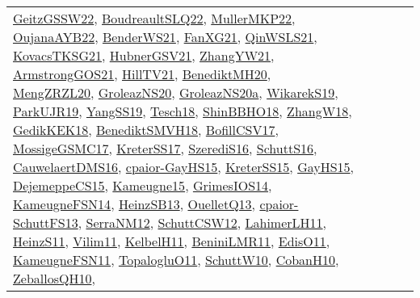 {\begin{longtable}{lp{3cm}>{\raggedright}p{6cm}>{\raggedright}p{6cm}p{8cm}}
\href{papers/GeitzGSSW22.pdf}{GeitzGSSW22}\cite{GeitzGSSW22}, \href{papers/BoudreaultSLQ22.pdf}{BoudreaultSLQ22}\cite{BoudreaultSLQ22}, \href{articles/MullerMKP22.pdf}{MullerMKP22}\cite{MullerMKP22}, \href{papers/OujanaAYB22.pdf}{OujanaAYB22}\cite{OujanaAYB22}, \href{papers/BenderWS21.pdf}{BenderWS21}\cite{BenderWS21}, \href{articles/FanXG21.pdf}{FanXG21}\cite{FanXG21}, \href{articles/QinWSLS21.pdf}{QinWSLS21}\cite{QinWSLS21}, \href{papers/KovacsTKSG21.pdf}{KovacsTKSG21}\cite{KovacsTKSG21}, \href{articles/HubnerGSV21.pdf}{HubnerGSV21}\cite{HubnerGSV21}, \href{articles/ZhangYW21.pdf}{ZhangYW21}\cite{ZhangYW21}, \href{papers/ArmstrongGOS21.pdf}{ArmstrongGOS21}\cite{ArmstrongGOS21}, \href{papers/HillTV21.pdf}{HillTV21}\cite{HillTV21}, \href{articles/BenediktMH20.pdf}{BenediktMH20}\cite{BenediktMH20}, \href{articles/MengZRZL20.pdf}{MengZRZL20}\cite{MengZRZL20}, \href{papers/GroleazNS20.pdf}{GroleazNS20}\cite{GroleazNS20}, \href{papers/GroleazNS20a.pdf}{GroleazNS20a}\cite{GroleazNS20a}, \href{articles/WikarekS19.pdf}{WikarekS19}\cite{WikarekS19}, \href{papers/ParkUJR19.pdf}{ParkUJR19}\cite{ParkUJR19}, \href{papers/YangSS19.pdf}{YangSS19}\cite{YangSS19}, \href{papers/Tesch18.pdf}{Tesch18}\cite{Tesch18}, \href{articles/ShinBBHO18.pdf}{ShinBBHO18}\cite{ShinBBHO18}, \href{articles/ZhangW18.pdf}{ZhangW18}\cite{ZhangW18}, \href{articles/GedikKEK18.pdf}{GedikKEK18}\cite{GedikKEK18}, \href{papers/BenediktSMVH18.pdf}{BenediktSMVH18}\cite{BenediktSMVH18}, \href{papers/BofillCSV17.pdf}{BofillCSV17}\cite{BofillCSV17}, \href{papers/MossigeGSMC17.pdf}{MossigeGSMC17}\cite{MossigeGSMC17}, \href{articles/KreterSS17.pdf}{KreterSS17}\cite{KreterSS17}, \href{papers/SzerediS16.pdf}{SzerediS16}\cite{SzerediS16}, \href{papers/SchuttS16.pdf}{SchuttS16}\cite{SchuttS16}, \href{papers/CauwelaertDMS16.pdf}{CauwelaertDMS16}\cite{CauwelaertDMS16}, \href{papers/cpaior-GayHS15.pdf}{cpaior-GayHS15}\cite{cpaior-GayHS15}, \href{papers/KreterSS15.pdf}{KreterSS15}\cite{KreterSS15}, \href{papers/GayHS15.pdf}{GayHS15}\cite{GayHS15}, \href{papers/DejemeppeCS15.pdf}{DejemeppeCS15}\cite{DejemeppeCS15}, \href{articles/Kameugne15.pdf}{Kameugne15}\cite{Kameugne15}, \href{articles/GrimesIOS14.pdf}{GrimesIOS14}\cite{GrimesIOS14}, \href{articles/KameugneFSN14.pdf}{KameugneFSN14}\cite{KameugneFSN14}, \href{articles/HeinzSB13.pdf}{HeinzSB13}\cite{HeinzSB13}, \href{papers/OuelletQ13.pdf}{OuelletQ13}\cite{OuelletQ13}, \href{papers/cpaior-SchuttFS13.pdf}{cpaior-SchuttFS13}\cite{cpaior-SchuttFS13}, \href{papers/SerraNM12.pdf}{SerraNM12}\cite{SerraNM12}, \href{papers/SchuttCSW12.pdf}{SchuttCSW12}\cite{SchuttCSW12}, \href{papers/LahimerLH11.pdf}{LahimerLH11}\cite{LahimerLH11}, \href{papers/HeinzS11.pdf}{HeinzS11}\cite{HeinzS11}, \href{papers/Vilim11.pdf}{Vilim11}\cite{Vilim11}, \href{articles/KelbelH11.pdf}{KelbelH11}\cite{KelbelH11}, \href{articles/BeniniLMR11.pdf}{BeniniLMR11}\cite{BeniniLMR11}, \href{papers/EdisO11.pdf}{EdisO11}\cite{EdisO11}, \href{papers/KameugneFSN11.pdf}{KameugneFSN11}\cite{KameugneFSN11}, \href{articles/TopalogluO11.pdf}{TopalogluO11}\cite{TopalogluO11}, \href{papers/SchuttW10.pdf}{SchuttW10}\cite{SchuttW10}, \href{papers/CobanH10.pdf}{CobanH10}\cite{CobanH10}, \href{articles/ZeballosQH10.pdf}{ZeballosQH10}\cite{ZeballosQH10}, 
\end{longtable}}
